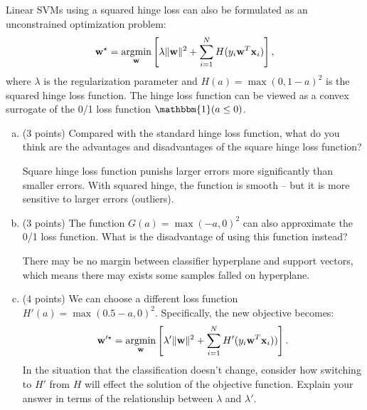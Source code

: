 \documentclass[11pt]{article}
\DeclareMathOperator*{\argmin}{argmin}
\newcommand{\vw}{{\bf w}}
\newcommand{\vxi}{{\bf x}_i}
\newcounter{QuestionCounter}
\newcounter{SubQuestionCounter}[QuestionCounter]
\newcommand{\newquestion}{\stepcounter{QuestionCounter}\setcounter{SubQuestionCounter}{1}\newpage}
\begin{document}
Linear SVMs using a squared hinge loss can also be formulated as an unconstrained optimization problem:
\begin{align}
\vw^{\star} = \argmin_{\vw} \left[ \lambda \lVert \vw \rVert^2 + \sum_{i=1}^N H(y_i \vw^T \vxi) \right],
\end{align}
where $\lambda$ is the regularization parameter and $H(a) = \max(0, 1-a)^2$ is the squared hinge loss function. The hinge loss function can be viewed as a convex surrogate of the 0/1 loss function $\mathbbm{1}(a \leq 0)$.
\begin{enumerate}[(a)]

\item (3 points) Compared with the standard hinge loss function, what do you think are the advantages and disadvantages of the square hinge loss function?

\begin{answertext}{8cm}{}
Square hinge loss function punishs larger errors more significantly than smaller errors. With squared hinge, the function is smooth – but it is more sensitive to larger errors (outliers).
\end{answertext} 

\item (3 points) The function $G(a) = \max(-a,0)^2$ can also approximate the 0/1 loss function. What is the disadvantage of using this function instead?

\begin{answertext}{7cm}{}
There may be no margin between classifier hyperplane and support vectors, which means there may exists some samples falled on hyperplane.
\end{answertext} 

\item (4 points) We can choose a different loss function $H'(a) = \max(0.5-a,0)^2$. Specifically, the new objective becomes:
\begin{align}
\vw'^{\star} = \argmin_{\vw} \left[ \lambda' \lVert \vw \rVert^2 + \sum_{i=1}^N H'(y_i \vw^T \vxi)) \right].
\end{align}
 In the situation that the classification doesn't change, consider how switching to $H'$ from $H$ will effect the solution of the objective function. Explain your answer in terms of the relationship between $\lambda$ and $\lambda'$. 
\end{enumerate}

\begin{answertext}{8cm}{}
    
\end{answertext} 
\newquestion
\end{document}
